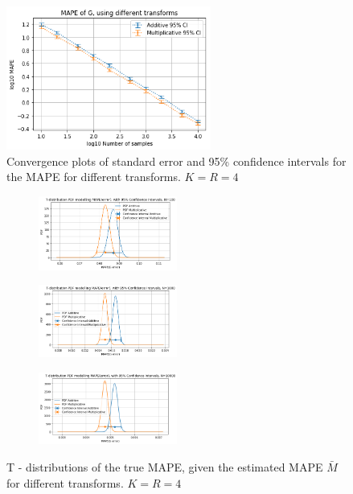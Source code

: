 \begin{figure}[H]
\begin{center}
    \includegraphics[width=0.6\textwidth]{figures/convergence_KR4.png}
\caption{Convergence plots of standard error and 95\% confidence intervals for the MAPE for different transforms. \(K=R=4\)}
\label{fig:Convergence_Transforms_KR4}
\end{center}
\end{figure}

\newpage

\begin{figure}[H]
\begin{center}
\begin{subfigure}
    \centering
    \includegraphics[width=0.5\textwidth]{figures/KR4N100_post.png}
\end{subfigure}
\begin{subfigure}
    \centering
    \includegraphics[width=0.5\textwidth]{figures/KR4N1000_post.png}
\end{subfigure}
\begin{subfigure}
    \centering
    \includegraphics[width=0.5\textwidth]{figures/KR4N10000_post.png}
\end{subfigure}
\caption{ T - distributions of the true MAPE, given the estimated MAPE \(\bar{M}\) for different transforms. \(K=R=4\)}
\label{fig:Posterior_sigma_transforms_KR4}
\end{center}
\end{figure}

